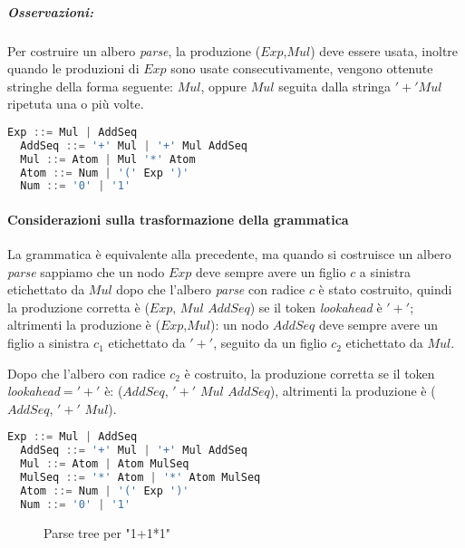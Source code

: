 \subparagraph{Osservazioni:}
Per costruire un albero \emph{parse}, la produzione ($Exp$,$Mul$) deve essere
usata, inoltre quando le produzioni di $Exp$ sono usate consecutivamente,
vengono ottenute stringhe della forma seguente: $Mul$, oppure $Mul$ seguita
dalla stringa $'+'Mul$ ripetuta una o più volte.

\begin{lstlisting}[language=Java, caption={Grammatica rivisitata a seguito delle osservazioni precedenti}]
  Exp ::= Mul | AddSeq
  AddSeq ::= '+' Mul | '+' Mul AddSeq
  Mul ::= Atom | Mul '*' Atom
  Atom ::= Num | '(' Exp ')'
  Num ::= '0' | '1'
\end{lstlisting}

\paragraph{Considerazioni sulla trasformazione della grammatica}
La grammatica è equivalente alla precedente, ma quando si costruisce un albero
\emph{parse} sappiamo che un nodo $Exp$ deve sempre avere un figlio $c$ a
sinistra etichettato da $Mul$ dopo che l'albero \emph{parse} con radice $c$ è
stato costruito, quindi la produzione corretta è ($Exp$, $Mul$ $AddSeq$) se
il token \emph{lookahead} è $'+'$;
altrimenti la produzione è ($Exp$,$Mul$): un nodo $AddSeq$ deve sempre avere un
figlio a sinistra $c_1$ etichettato da $'+'$, seguito da un figlio $c_2$
etichettato da $Mul$.

Dopo che l'albero con radice $c_2$  è costruito, la produzione corretta se
il token \emph{lookahead}$='+'$ è: ($AddSeq$, $'+'$ $Mul$ $AddSeq$), altrimenti
la produzione è ($AddSeq$, $'+'$ $Mul$).

\begin{lstlisting}[language=Java, caption={Soluzione completa}]
  Exp ::= Mul | AddSeq
  AddSeq ::= '+' Mul | '+' Mul AddSeq
  Mul ::= Atom | Atom MulSeq
  MulSeq ::= '*' Atom | '*' Atom MulSeq
  Atom ::= Num | '(' Exp ')'
  Num ::= '0' | '1'
\end{lstlisting}

\begin{figure}[H]
\caption{Parse tree per "1+1*1"}
\centering{}\end{figure}
